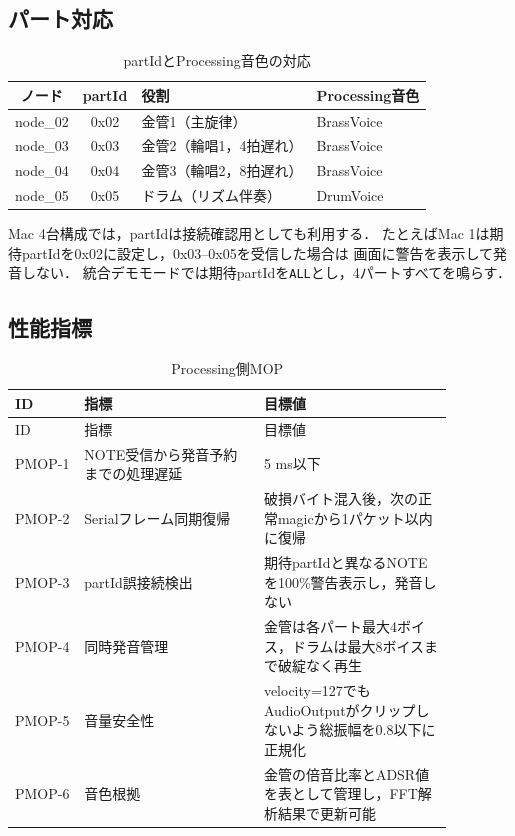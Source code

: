 \documentclass[a4paper,11pt]{jsarticle}
\begin{document}
\subsection{パート対応}

\begin{table}[h]
\centering
\caption{partIdとProcessing音色の対応}
\label{tab:part}
\begin{tabular}{ccll}
\toprule
ノード & partId & 役割 & Processing音色 \\
\midrule
node\_02 & 0x02 & 金管1（主旋律） & BrassVoice \\
node\_03 & 0x03 & 金管2（輪唱1，4拍遅れ） & BrassVoice \\
node\_04 & 0x04 & 金管3（輪唱2，8拍遅れ） & BrassVoice \\
node\_05 & 0x05 & ドラム（リズム伴奏） & DrumVoice \\
\bottomrule
\end{tabular}
\end{table}

Mac 4台構成では，partIdは接続確認用としても利用する．
たとえばMac 1は期待partIdを0x02に設定し，0x03--0x05を受信した場合は
画面に警告を表示して発音しない．
統合デモモードでは期待partIdを\texttt{ALL}とし，4パートすべてを鳴らす．

\subsection{性能指標}

\begin{longtable}{p{0.13\linewidth}p{0.36\linewidth}p{0.38\linewidth}}
\caption{Processing側MOP}\label{tab:mop}\\
\toprule
ID & 指標 & 目標値 \\
\midrule
\endfirsthead
\toprule
ID & 指標 & 目標値 \\
\midrule
\endhead
PMOP-1 & NOTE受信から発音予約までの処理遅延 & 5 ms以下 \\
PMOP-2 & Serialフレーム同期復帰 & 破損バイト混入後，次の正常magicから1パケット以内に復帰 \\
PMOP-3 & partId誤接続検出 & 期待partIdと異なるNOTEを100\%警告表示し，発音しない \\
PMOP-4 & 同時発音管理 & 金管は各パート最大4ボイス，ドラムは最大8ボイスまで破綻なく再生 \\
PMOP-5 & 音量安全性 & velocity=127でもAudioOutputがクリップしないよう総振幅を0.8以下に正規化 \\
PMOP-6 & 音色根拠 & 金管の倍音比率とADSR値を表として管理し，FFT解析結果で更新可能 \\
\bottomrule
\end{longtable}
\end{document}
